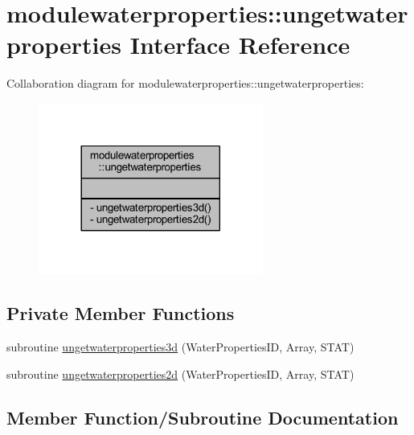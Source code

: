 \hypertarget{interfacemodulewaterproperties_1_1ungetwaterproperties}{}\section{modulewaterproperties\+:\+:ungetwaterproperties Interface Reference}
\label{interfacemodulewaterproperties_1_1ungetwaterproperties}


Collaboration diagram for modulewaterproperties\+:\+:ungetwaterproperties\+:\nopagebreak
\begin{figure}[H]
\begin{center}
\leavevmode
\includegraphics[width=209pt]{interfacemodulewaterproperties_1_1ungetwaterproperties__coll__graph}
\end{center}
\end{figure}
\subsection*{Private Member Functions}
\begin{DoxyCompactItemize}
\item 
subroutine \mbox{\hyperlink{interfacemodulewaterproperties_1_1ungetwaterproperties_a42b468e21e2ca11e96d45af483e4b3dc}{ungetwaterproperties3d}} (Water\+Properties\+ID, Array, S\+T\+AT)
\item 
subroutine \mbox{\hyperlink{interfacemodulewaterproperties_1_1ungetwaterproperties_a26bf0f2bf6750de70899c8b9f0fdb73b}{ungetwaterproperties2d}} (Water\+Properties\+ID, Array, S\+T\+AT)
\end{DoxyCompactItemize}


\subsection{Member Function/\+Subroutine Documentation}
\mbox{\label{interfacemodulewaterproperties_1_1ungetwaterproperties_a26bf0f2bf6750de70899c8b9f0fdb73b}} 
